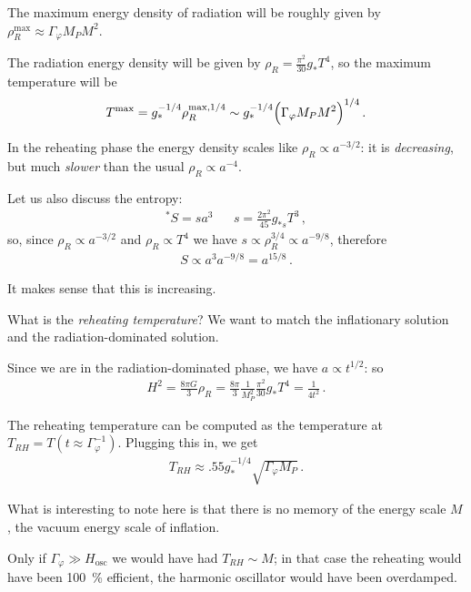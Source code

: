 \documentclass[main.tex]{subfiles}
\begin{document}
The maximum energy density of radiation will be roughly given by \(\rho _R^{\text{max}} \approx \Gamma _\varphi M_P M^2\). 

The radiation energy density will be given by \(\rho _R = \frac{\pi^2}{30} g_* T^{4}\), so the maximum temperature will be 
%
\begin{align}
T^{\text{max}} = g_*^{-1/4} \rho _R^{\text{max}, 1/4} \sim g_*^{-1/4} \qty(\Gamma _\varphi M_P M^2)^{1/4}
\,.
\end{align}

In the reheating phase the energy density scales like \(\rho _R \propto a^{- 3/2}\): it is \emph{decreasing}, but much \emph{slower} than the usual \(\rho _R \propto a^{-4}\). 

Let us also discuss the entropy: 
%
\begin{align}
^*S = s a^3 &&
s = \frac{2 \pi^2}{45} g_{*s} T^3
\,,
\end{align}
%
so, since \(\rho _R \propto a^{-3/2}\) and \(\rho _R \propto T^{4}\) we have \(s \propto \rho _R^{3/4} \propto a^{- 9/8}\), therefore
%
\begin{align}
S \propto a^3 a^{-9/8} = a^{15/8}
\,.
\end{align}

It makes sense that this is increasing. 

What is the \emph{reheating temperature}? We want to match the inflationary solution and the radiation-dominated solution. 

Since we are in the radiation-dominated phase, we have \(a \propto t^{1/2}\): so
%
\begin{align}
H^2 = \frac{8 \pi G}{3} \rho _R = \frac{8 \pi }{3} \frac{1}{M_P^2} \frac{\pi^2}{30} g_* T^{4} = \frac{1}{4t^2}
\,.
\end{align}

The reheating temperature can be computed as the temperature at \(T_{RH} = T (t \approx \Gamma _\varphi^{-1})\). 
Plugging this in, we get 
%
\begin{align} \label{eq:reheating-temperature}
T_{RH} \approx \num{.55} g_*^{-1/4} \sqrt{\Gamma _\varphi M_P}
\,.
\end{align}

What is interesting to note here is that there is no memory of the energy scale \(M\), the vacuum energy scale of inflation. 

Only if \(\Gamma _\varphi \gg H _{\text{osc}}\) we would have had \(T_{RH} \sim M\); in that case the reheating would have been \SI{100}{\percent} efficient, the harmonic oscillator would have been overdamped. 
\end{document}

